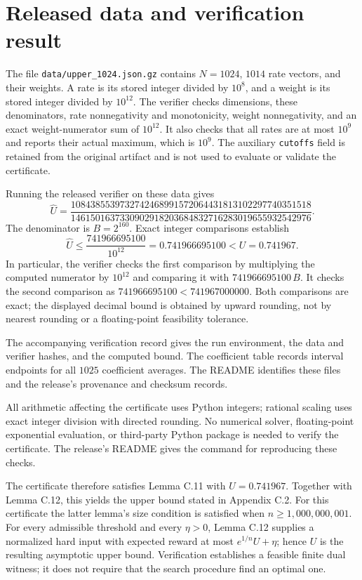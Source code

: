 \documentclass[11pt,letterpaper]{article}
\begin{document}
\newpage
\section{Released data and verification result}
The file \texttt{data/upper\_1024.json.gz} contains $N=1024$,
$1014$ rate vectors, and their weights. A rate is its stored integer
divided by $10^8$, and a weight is its stored integer divided by
$10^{12}$. The verifier checks dimensions, these denominators,
rate nonnegativity and monotonicity, weight nonnegativity, and an exact
weight-numerator sum of $10^{12}$. It also checks that all rates are at
most $10^9$ and reports their actual maximum, which is $10^9$.
The auxiliary \texttt{cutoffs} field is retained from the original artifact
and is not used to evaluate or validate the certificate.

Running the released verifier on these data gives
\[
 \widehat U=
 \frac{1084385539732742468991572064431813102297740351518}
      {1461501637330902918203684832716283019655932542976}.
\]
The denominator is $B=2^{160}$. Exact integer comparisons establish
\[
 \widehat U\le
 \frac{741966695100}{10^{12}}
 =0.741966695100
 <U=0.741967.
\]
In particular, the verifier checks the first comparison by multiplying
the computed numerator by $10^{12}$ and comparing it with
$741966695100\,B$. It checks the second comparison as
$741966695100<741967000000$. Both comparisons are exact; the displayed
decimal bound is obtained by upward rounding, not by nearest rounding
or a floating-point feasibility tolerance.

The accompanying verification record gives the run environment,
the data and verifier hashes, and the computed bound. The coefficient
table records interval endpoints for all $1025$ coefficient averages.
The README identifies these files and the release's provenance and
checksum records.

All arithmetic affecting the certificate uses Python integers; rational
scaling uses exact integer division with directed rounding. No numerical
solver, floating-point exponential evaluation, or third-party Python
package is needed to verify the certificate. The release's README gives
the command for reproducing these checks.

The certificate therefore satisfies Lemma C.11 with $U=0.741967$.
Together with Lemma C.12, this yields the upper bound stated in Appendix
C.2. For this certificate the latter lemma's size condition is satisfied
when $n\ge1{,}000{,}000{,}001$. For every admissible threshold and every
$\eta>0$, Lemma C.12 supplies a normalized hard input with expected
reward at most $e^{1/n}U+\eta$; hence $U$ is the resulting asymptotic
upper bound. Verification establishes a feasible finite dual witness;
it does not require that the search procedure find an optimal one.
\end{document}
